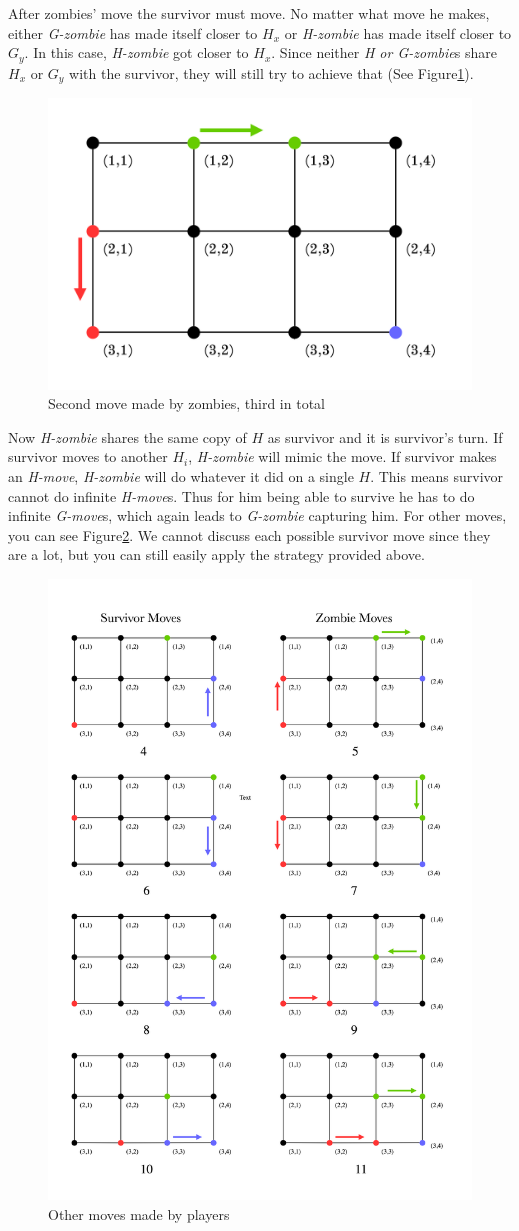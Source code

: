 \documentclass[1p]{elsarticle}
\begin{document}
After zombies' move the survivor must move. No matter what move he makes, either {\it G-zombie} has made itself closer
to $H_x$ or {\it H-zombie} has made itself closer to $G_y$. In this case, {\it H-zombie} got closer to $H_x$. Since
neither {\it H or G-zombie}s share $H_x$ or $G_y$ with the survivor, they will still try to achieve that (See Figure\ref{fig:p5}).

\begin{figure}[h!]
	\centering
	\includegraphics[width=0.5\linewidth]{fig/p34m3.png}
	\caption{Second move made by zombies, third in total}
	\label{fig:p5}
\end{figure}

Now {\it H-zombie} shares the same copy of $H$ as survivor and it is survivor's turn. If survivor moves to another $H_i$,
{\it H-zombie} will mimic the move. If survivor makes an {\it H-move}, {\it H-zombie} will do whatever it did on a
single $H$. This means survivor cannot do infinite {\it H-move}s. Thus for him being able to survive he has to do
infinite {\it G-move}s, which again leads to {\it G-zombie} capturing him. For other moves, you can see
Figure\ref{fig:p6}. We cannot discuss each possible survivor move since they are a lot, but you can still easily apply
the strategy provided above. 

\begin{figure}[h!]
	\centering
	\includegraphics[width=0.6\linewidth]{fig/p34m6.png}
	\caption{Other moves made by players}
	\label{fig:p6}
\end{figure}

	
\end{document}
